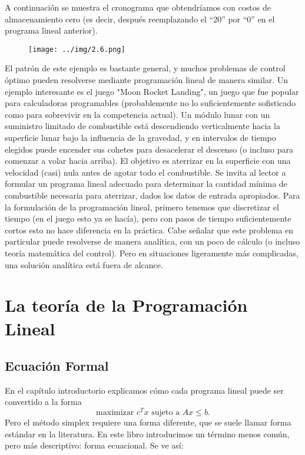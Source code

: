 \documentclass{article}
\begin{document}
A continuación se muestra el cronograma que obtendríamos con costos de almacenamiento cero (es decir, después reemplazando el “20” por “0” en el programa lineal anterior). 
\begin{figure}[H] %
\centering %
\texttt{[image: ../img/2.6.png]} %
\label{fig:imagen} %
\end{figure}

El patrón de este ejemplo es bastante general, y muchos problemas de control óptimo pueden resolverse mediante programación lineal de manera similar. Un ejemplo interesante es el juego "Moon Rocket Landing", un juego que fue popular para calculadoras programables (probablemente no lo suficientemente sofisticado como para sobrevivir en la competencia actual). Un módulo lunar con un suministro limitado de combustible está descendiendo verticalmente hacia la superficie lunar bajo la influencia de la gravedad, y en intervalos de tiempo elegidos puede encender sus cohetes para desacelerar el descenso (o incluso para comenzar a volar hacia arriba). El objetivo es aterrizar en la superficie con una velocidad (casi) nula antes de agotar todo el combustible. Se invita al lector a formular un programa lineal adecuado para determinar la cantidad mínima de combustible necesaria para aterrizar, dados los datos de entrada apropiados. Para la formulación de la programación lineal, primero tenemos que discretizar el tiempo (en el juego esto ya se hacía), pero con pasos de tiempo suficientemente cortos esto no hace diferencia en la práctica. Cabe señalar que este problema en particular puede resolverse de manera analítica, con un poco de cálculo (o incluso teoría matemática del control). Pero en situaciones ligeramente más complicadas, una solución analítica está fuera de alcance.

\newpage

\section{La teoría de la Programación Lineal}
\subsection{Ecuación Formal}
En el capítulo introductorio explicamos cómo cada programa lineal puede ser convertido a la forma
\[
\text{maximizar } c^T x \text{ sujeto a } Ax \leq b.
\]
Pero el método simplex requiere una forma diferente, que se suele llamar forma estándar en la literatura. En este libro introducimos un término menos común, pero más descriptivo: forma ecuacional. Se ve así:
\end{document}

